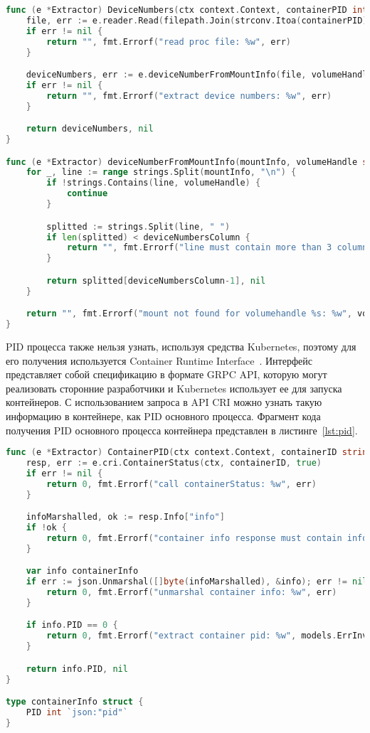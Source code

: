 \begin{lstlisting}[language=Go,label=lst:proc_parse, caption={Получение номеров устройства}]
func (e *Extractor) DeviceNumbers(ctx context.Context, containerPID int, volumeHandle string) (string, error) {
	file, err := e.reader.Read(filepath.Join(strconv.Itoa(containerPID), "mountinfo"))
	if err != nil {
		return "", fmt.Errorf("read proc file: %w", err)
	}

	deviceNumbers, err := e.deviceNumberFromMountInfo(file, volumeHandle)
	if err != nil {
		return "", fmt.Errorf("extract device numbers: %w", err)
	}

	return deviceNumbers, nil
}

func (e *Extractor) deviceNumberFromMountInfo(mountInfo, volumeHandle string) (string, error) {
	for _, line := range strings.Split(mountInfo, "\n") {
		if !strings.Contains(line, volumeHandle) {
			continue
		}

		splitted := strings.Split(line, " ")
		if len(splitted) < deviceNumbersColumn {
			return "", fmt.Errorf("line must contain more than 3 columns: %w (%q)", models.ErrInvalidProcFile, line)
		}

		return splitted[deviceNumbersColumn-1], nil
	}

	return "", fmt.Errorf("mount not found for volumehandle %s: %w", volumeHandle, models.ErrNoVolumeEntry)
}
\end{lstlisting}

PID процесса также нельзя узнать, используя средства Kubernetes, поэтому для его получения используется Container Runtime Interface~\cite{cri}. Интерфейс представляет собой спецификацию в формате GRPC API, которую могут реализовать сторонние разработчики и Kubernetes использует ее для запуска контейнеров. С использованием запроса в API CRI можно узнать такую информацию в контейнере, как PID основного процесса. Фрагмент кода получения PID основного процесса контейнера представлен в листинге~\ref{lst:pid}.

\begin{lstlisting}[language=Go,label=lst:pid, caption={Получение PID основного процесса контейнера}]
func (e *Extractor) ContainerPID(ctx context.Context, containerID string) (int, error) {
	resp, err := e.cri.ContainerStatus(ctx, containerID, true)
	if err != nil {
		return 0, fmt.Errorf("call containerStatus: %w", err)
	}

	infoMarshalled, ok := resp.Info["info"]
	if !ok {
		return 0, fmt.Errorf("container info response must contain info block: %w", models.ErrInvalidContainerInfo)
	}

	var info containerInfo
	if err := json.Unmarshal([]byte(infoMarshalled), &info); err != nil {
		return 0, fmt.Errorf("unmarshal container info: %w", err)
	}

	if info.PID == 0 {
		return 0, fmt.Errorf("extract container pid: %w", models.ErrInvalidContainerInfo)
	}

	return info.PID, nil
}

type containerInfo struct {
	PID int `json:"pid"`
}
\end{lstlisting}

